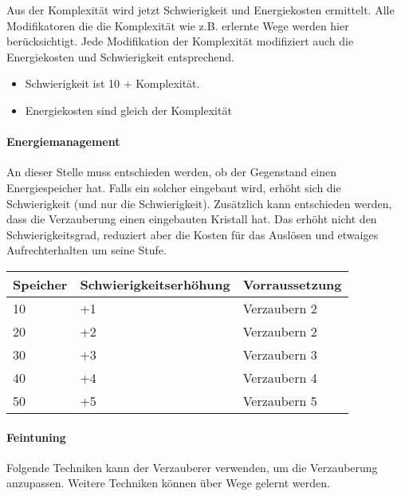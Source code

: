 \documentclass{article}
\begin{document}
Aus der Komplexität wird jetzt Schwierigkeit und Energiekosten ermittelt. Alle Modifikatoren die die Komplexität wie
z.B. erlernte Wege werden hier berücksichtigt. Jede Modifikation der Komplexität modifiziert auch die Energiekosten
und Schwierigkeit entsprechend.

\begin{itemize}
\item Schwierigkeit ist 10 + Komplexität.
\item Energiekosten sind gleich der Komplexität
\end{itemize}

\paragraph{Energiemanagement}

An dieser Stelle muss entschieden werden, ob der Gegenstand einen Energiespeicher hat. Falls ein solcher eingebaut
wird, erhöht sich die Schwierigkeit (und nur die Schwierigkeit). Zusätzlich kann entschieden werden, dass die
Verzauberung einen eingebauten Kristall hat. Das erhöht nicht den Schwierigkeitsgrad, reduziert aber die Kosten
für das Auslösen und etwaiges Aufrechterhalten um seine Stufe.


\begin{small}
\begin{tabular}{|m{3cm}|m{4cm}|m{3cm}|}
\hline
\textbf{Speicher}&\textbf{Schwierigkeitserhöhung}&\textbf{Vorraussetzung}\\
\hline
\hline
10&+1&Verzaubern 2\\
\hline
20&+2&Verzaubern 2\\
\hline
30&+3&Verzaubern 3\\
\hline
40&+4&Verzaubern 4\\
\hline
50&+5&Verzaubern 5\\
\hline
\end{tabular}
\end{small}

\paragraph{Feintuning}

Folgende Techniken kann der Verzauberer verwenden, um die Verzauberung anzupassen. Weitere Techniken können über Wege
gelernt werden.
\end{document}
